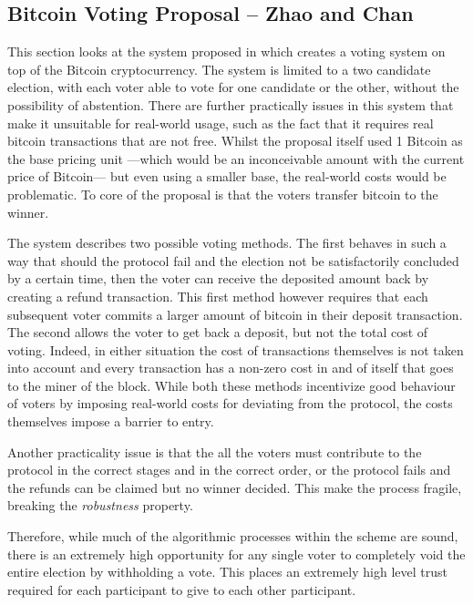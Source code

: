 \subsection{Bitcoin Voting Proposal -- Zhao and Chan}

This section looks at the system proposed in \cite{zhaoHowVotePrivately2016} which creates a voting system on top of the Bitcoin cryptocurrency. The system is limited to a two candidate election, with each voter able to vote for one candidate or the other, without the possibility of abstention. There are further practically issues in this system that make it unsuitable for real-world usage, such as the fact that it requires real bitcoin transactions that are not free. Whilst the proposal itself used 1 Bitcoin as the base pricing unit ---which would be an inconceivable amount with the current price of Bitcoin--- but even using a smaller base, the real-world costs would be problematic. To core of the proposal is that the voters transfer bitcoin to the winner.

The system describes two possible voting methods. The first behaves in such a way that should the protocol fail and the election not be satisfactorily concluded by a certain time, then the voter can receive the deposited amount back by creating a refund transaction. This first method however requires that each subsequent voter commits a larger amount of bitcoin in their deposit transaction. The second allows the voter to get back a deposit, but not the total cost of voting. Indeed, in either situation the cost of transactions themselves is not taken into account and every transaction has a non-zero cost in and of itself that goes to the miner of the block. While both these methods incentivize good behaviour of voters by imposing real-world costs for deviating from the protocol, the costs themselves impose a barrier to entry.

Another practicality issue is that the all the voters must contribute to the protocol in the correct stages and in the correct order, or the protocol fails and the refunds can be claimed but no winner decided. This make the process fragile, breaking the \emph{robustness} property.

Therefore, while much of the algorithmic processes within the scheme are sound, there is an extremely high opportunity for any single voter to completely void the entire election by withholding a vote. This places an extremely high level trust required for each participant to give to each other participant.

